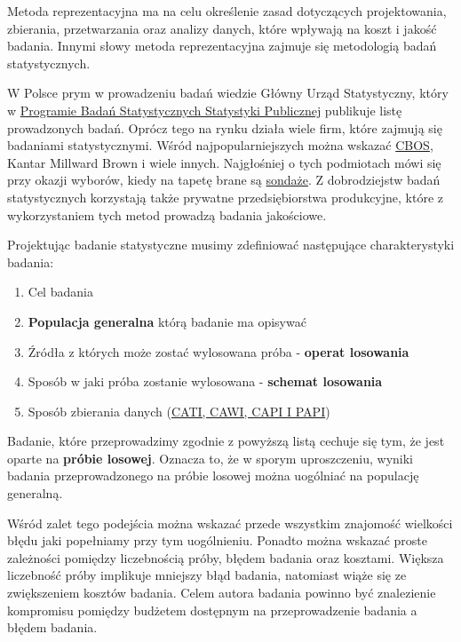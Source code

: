 \documentclass[
]{book}
\providecommand{\tightlist}{%
  \setlength{\itemsep}{0pt}\setlength{\parskip}{0pt}}
\begin{document}
Metoda reprezentacyjna ma na celu określenie zasad dotyczących projektowania, zbierania, przetwarzania oraz analizy danych, które wpływają na koszt i jakość badania. Innymi słowy metoda reprezentacyjna zajmuje się metodologią badań statystycznych.

W Polsce prym w prowadzeniu badań wiedzie Główny Urząd Statystyczny, który w \href{https://bip.stat.gov.pl/dzialalnosc-statystyki-publicznej/program-badan-statystycznych/pbssp-2020/}{Programie Badań Statystycznych Statystyki Publicznej} publikuje listę prowadzonych badań. Oprócz tego na rynku działa wiele firm, które zajmują się badaniami statystycznymi. Wśród najpopularniejszych można wskazać \href{https://www.cbos.pl/PL/home/home.php}{CBOS}, Kantar Millward Brown i wiele innych. Najgłośniej o tych podmiotach mówi się przy okazji wyborów, kiedy na tapetę brane są \href{https://sprawdzamysondaze.pl/}{sondaże}. Z dobrodziejstw badań statystycznych korzystają także prywatne przedsiębiorstwa produkcyjne, które z wykorzystaniem tych metod prowadzą badania jakościowe.

Projektując badanie statystyczne musimy zdefiniować następujące charakterystyki badania:

\begin{enumerate}
\def\labelenumi{\arabic{enumi}.}
\tightlist
\item
  Cel badania
\item
  \textbf{Populacja generalna} którą badanie ma opisywać
\item
  Źródła z których może zostać wylosowana próba - \textbf{operat losowania}
\item
  Sposób w jaki próba zostanie wylosowana - \textbf{schemat losowania}
\item
  Sposób zbierania danych (\href{https://beedifferent.pl/blog/techniki-organizacji-badan-komunikacji-wewnetrznej-cati-cawi-capi-i-papi}{CATI, CAWI, CAPI I PAPI})
\end{enumerate}

Badanie, które przeprowadzimy zgodnie z powyższą listą cechuje się tym, że jest oparte na \textbf{próbie losowej}. Oznacza to, że w sporym uproszczeniu, wyniki badania przeprowadzonego na próbie losowej można uogólniać na populację generalną.

Wśród zalet tego podejścia można wskazać przede wszystkim znajomość wielkości błędu jaki popełniamy przy tym uogólnieniu. Ponadto można wskazać proste zależności pomiędzy liczebnością próby, błędem badania oraz kosztami. Większa liczebność próby implikuje mniejszy błąd badania, natomiast wiąże się ze zwiększeniem kosztów badania. Celem autora badania powinno być znalezienie kompromisu pomiędzy budżetem dostępnym na przeprowadzenie badania a błędem badania.
\end{document}

